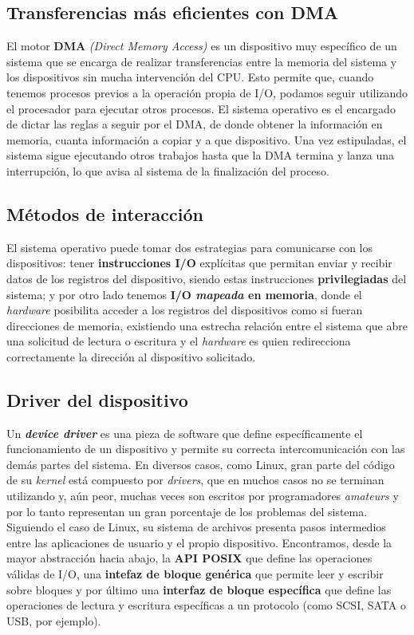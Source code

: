 \documentclass{article}
\begin{document}
	\subsection{Transferencias más eficientes con DMA}
	El motor \textbf{DMA} \textit{(Direct Memory Access)} es un dispositivo muy específico de un sistema que se encarga de realizar transferencias entre la memoria del sistema y los dispositivos sin mucha intervención del CPU. Esto permite que, cuando tenemos procesos previos a la operación propia de I/O, podamos seguir utilizando el procesador para ejecutar otros procesos. El sistema operativo es el encargado de dictar las reglas a seguir por el DMA, de donde obtener la información en memoria, cuanta información a copiar y a que dispositivo. Una vez estipuladas, el sistema sigue ejecutando otros trabajos hasta que la DMA termina y lanza una interrupción, lo que avisa al sistema de la finalización del proceso.
	
	\subsection{Métodos de interacción}
	El sistema operativo puede tomar dos estrategias para comunicarse con los dispositivos: tener \textbf{instrucciones I/O} explícitas que permitan enviar y recibir datos de los registros del dispositivo, siendo estas instrucciones \textbf{privilegiadas} del sistema; y por otro lado tenemos \textbf{I/O \textit{mapeada} en memoria}, donde el \textit{hardware} posibilita acceder a los registros del dispositivos como si fueran direcciones de memoria, existiendo una estrecha relación entre el sistema que abre una solicitud de lectura o escritura y el \textit{hardware} es quien redirecciona correctamente la dirección al dispositivo solicitado.
	
	\subsection{Driver del dispositivo}
	Un \textit{\textbf{device driver}} es una pieza de software que define específicamente el funcionamiento de un dispositivo y permite su correcta intercomunicación con las demás partes del sistema. En diversos casos, como Linux, gran parte del código de su \textit{kernel} está compuesto por \textit{drivers}, que en muchos casos no se terminan utilizando y, aún peor, muchas veces son escritos por programadores \textit{amateurs} y por lo tanto representan un gran porcentaje de los problemas del sistema. Siguiendo el caso de Linux, su sistema de archivos presenta pasos intermedios entre las aplicaciones de usuario y el propio dispositivo. Encontramos, desde la mayor abstracción hacia abajo, la \textbf{API POSIX} que define las operaciones válidas de I/O, una \textbf{intefaz de bloque genérica} que permite leer y escribir sobre bloques y por último una \textbf{interfaz de bloque específica} que define las operaciones de lectura y escritura específicas a un protocolo (como SCSI, SATA o USB, por ejemplo).
	
\end{document}
